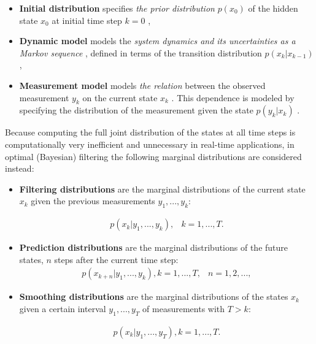 \documentclass[10pt]{llncs}
\begin{document}
\begin{itemize}

\item \textbf{Initial distribution} specifies \textit{the prior distribution} $p(x_0 )$ of the hidden state $x_0$ at initial time step $k = 0$ ,

\item \textbf{Dynamic model} models the \textit{system dynamics and its uncertainties as a Markov sequence} , defined in terms of the transition distribution $p(x_k | x_{k−1} )$ ,

\item \textbf{Measurement model} models \textit{the relation} between the observed measurement $y_k$ on the current state $x_k$ . This dependence is modeled by specifying the distribution of the measurement given the state $p(y_k | x_k )$ .
\end{itemize}

Because computing the full joint distribution of the states at all time steps is computationally very inefficient and unnecessary in real-time applications, in optimal
(Bayesian) filtering the following marginal distributions are considered instead:
\begin{itemize}
\item \textbf{Filtering distributions} are the marginal distributions of the current state $x_k$ given the previous measurements ${y_1 , . . . , y_k}$:

\begin{eqnarray} \label{eqn: Filtering distributions}
p(x_k | y_1 , . . . , y_k ), & k = 1, . . . , T.
\end{eqnarray}

\item \textbf{Prediction distributions} are the marginal distributions of the future states, $n$ steps after the current time step:
\begin{eqnarray} \label{eqn: Prediction distributions}
p(x_{k+n} | y_1 , . . . , y_k ) , k = 1, . . . , T , & n = 1, 2, . . . ,
\end{eqnarray}

\item \textbf{Smoothing distributions} are the marginal distributions of the states $x_k$ given a certain interval ${y_1 , . . . , y_T }$ of measurements with $T > k$:

\begin{eqnarray}\label{eqn: Smoothing distributions}
p(x_k | y_1 , . . . , y_T ), k = 1, . . . , T.
\end{eqnarray}

\end{itemize}
\end{document}
